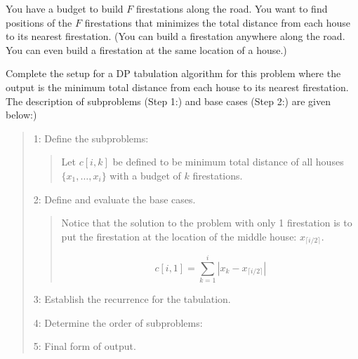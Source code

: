 \documentclass[10pt,letterpaper,unboxed,cm]{article}
\begin{document}
\begin{enumerate}
You have a budget to build $F$ firestations along the road. You want to find positions of the $F$ firestations that minimizes the total distance from each house to its nearest firestation. (You can build a firestation anywhere along the road. You can even build a firestation at the same location of a house.)

Complete the setup for a DP tabulation algorithm for this problem where the output is the minimum total distance from each house to its nearest firestation.  The description of subproblems (Step 1:) and base cases (Step 2:) are given below:)

\begin{quote}
1: Define the subproblems:
\begin{quote}
Let $c[i,k]$ be defined to be minimum total distance of all houses $\{x_1,\dots,x_i\}$ with a budget of $k$ firestations.
\end{quote}

2: Define and evaluate the base cases.

\begin{quote}
Notice that the solution to the problem with only 1 firestation is to put the firestation at the location of the middle house: $x_{\lceil i/2\rceil}$.

{\color{blue} $$c[i,1] = \sum_{k=1}^i |x_k-x_{\lceil i/2\rceil}|$$}
\end{quote}

3: Establish the recurrence for the tabulation.

4: Determine the order of subproblems:

5: Final form of output.

\end{quote}

\end{enumerate}
\end{document}
